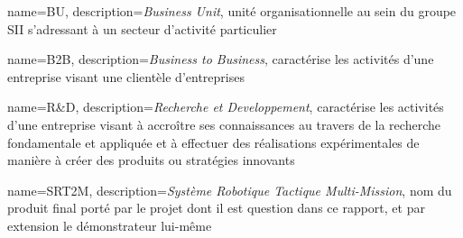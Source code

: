 {
	name={BU},
	description={\emph{Business Unit}, unité organisationnelle au sein du groupe SII s'adressant à un secteur d'activité particulier}
}

{
	name={B2B},
	description={\emph{Business to Business}, caractérise les activités d'une entreprise visant une clientèle d'entreprises}
}

{
	name={R\&D},
	description={\emph{Recherche et Developpement}, caractérise les activités d'une entreprise visant à accroître ses connaissances au travers de la recherche fondamentale et appliquée et à effectuer des réalisations expérimentales de manière à créer des produits ou stratégies innovants}
}

{
	name={SRT2M},
	description={\emph{Système Robotique Tactique Multi-Mission}, nom du produit final porté par le projet dont il est question dans ce rapport, et par extension le démonstrateur lui-même}
}
